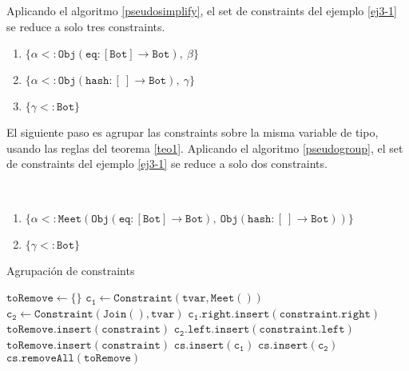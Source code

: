 Aplicando el algoritmo \ref{pseudosimplify}, el set de constraints del ejemplo \ref{ej3-1} se reduce a solo tres constraints.

\begin{enumerate}
  \item $\mathtt{\{\alpha <: Obj(eq : [Bot] \rightarrow Bot),\ \beta\}}$
  \item $\mathtt{\{\alpha <: Obj(hash : [\ ] \rightarrow Bot),\ \gamma\}}$
  \item $\mathtt{\{\gamma <: Bot\}}$
\end{enumerate}

El siguiente paso es agrupar las constraints sobre la misma variable de tipo, usando las reglas del teorema \ref{teo1}. Aplicando el algoritmo \ref{pseudogroup}, el set de constraints del ejemplo \ref{ej3-1} se reduce a solo dos constraints.

\begin{ej}\ \\
  \normalfont
  \label{ej3-2}
  \begin{enumerate}
    \item $\mathtt{\{\alpha <: Meet(Obj(eq : [Bot] \rightarrow Bot),\ Obj(hash : [\ ] \rightarrow Bot))\}}$
    \item $\mathtt{\{\gamma <: Bot\}}$
  \end{enumerate}
\end{ej}

\clearpage %
\begin{algorithm}\captionsetup{labelsep=newline}
  \centering
  \caption{Agrupación de constraints}
  \label{pseudogroup}
    \begin{algorithmic}[1]
          \State $\mathtt{toRemove\gets \{\}}$
            \State $\mathtt{c_1\gets Constraint(tvar, Meet())}$
            \State $\mathtt{c_2\gets Constraint(Join(), tvar)}$
                \State $\mathtt{c_1.right.insert(constraint.right)}$
                \State $\mathtt{toRemove.insert(constraint)}$
              \EndIf
                \State $\mathtt{c_2.left.insert(constraint.left)}$
                \State $\mathtt{toRemove.insert(constraint)}$
              \EndIf
            \EndFor
              \State $\mathtt{cs.insert(c_1)}$
            \EndIf
              \State $\mathtt{cs.insert(c_2)}$
            \EndIf
          \EndFor
          \State $\mathtt{cs.removeAll(toRemove)}$
      \EndFunction
    \end{algorithmic}
\end{algorithm}


